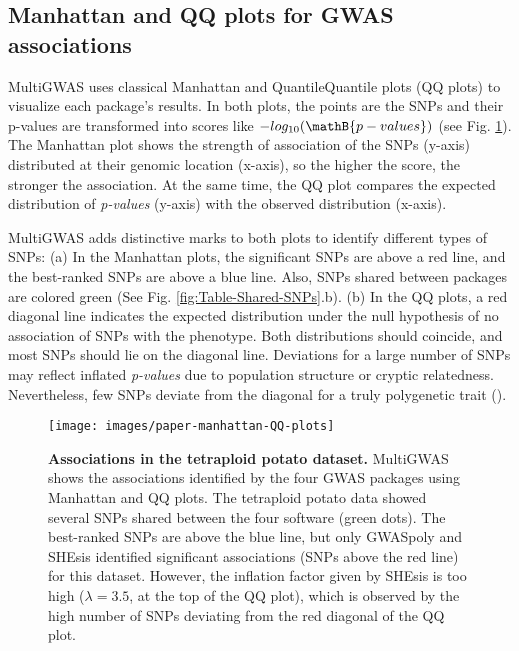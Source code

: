 \documentclass{article}
\begin{document}

\subsection{Manhattan and QQ plots for GWAS associations }

MultiGWAS uses classical Manhattan and Quantile\textendash Quantile plots (QQ plots) to visualize each package's results. In both plots, the points are the SNPs and their p-values are transformed into scores like $-log_{10}(\mathB{p-values})$ (see Fig. \ref{fig:view-qqmanhattan}). The Manhattan plot shows the strength of association of the SNPs (y-axis) distributed at their genomic location (x-axis), so the higher the score, the stronger the association. At the same time, the QQ plot compares the expected distribution of \emph{p-values} (y-axis) with the observed distribution (x-axis).

MultiGWAS adds distinctive marks to both plots to identify different types of SNPs: (a) In the Manhattan plots, the significant SNPs are above a red line, and the best-ranked SNPs are above a blue line. Also, SNPs shared between packages are colored green (See Fig. \ref{fig:Table-Shared-SNPs}.b). (b) In the QQ plots, a red diagonal line indicates the expected distribution under the null hypothesis of no association of SNPs with the phenotype. Both distributions should coincide, and most SNPs should lie on the diagonal line. Deviations for a large number of SNPs may reflect inflated {\emph{p-values }}due to population structure or cryptic relatedness. Nevertheless, few SNPs deviate from the diagonal for a truly polygenetic trait (\cite{Power2016}).

\begin{figure}[H]
\begin{centering}
\texttt{[image: images/paper-manhattan-QQ-plots]}
\par\end{centering}
\caption{\textbf{{Associations in the tetraploid potato dataset.}} MultiGWAS shows the associations identified by the four GWAS packages using Manhattan and QQ plots. The tetraploid potato data showed several SNPs shared between the four software (green dots). The best-ranked SNPs are above the blue line, but only GWASpoly and SHEsis identified significant associations (SNPs above the red line) for this dataset. However, the inflation factor given by SHEsis is too high ($\lambda=3.5$, at the top of the QQ plot), which is observed by the high number of SNPs deviating from the red diagonal of the QQ plot. \label{fig:view-qqmanhattan}}
\end{figure}
\end{document}
